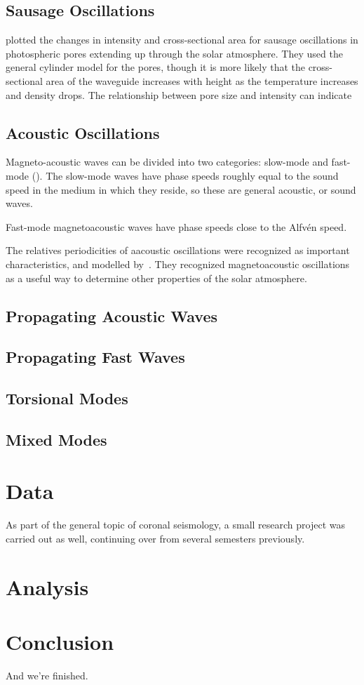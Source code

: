 \documentclass[preprint2]{aastex}
\begin{document}
\subsection{Sausage Oscillations}
\cite{sausage_1} plotted the changes in intensity and cross-sectional
area for sausage oscillations in photospheric pores extending up
through the solar atmosphere. They used the general cylinder model for
the pores, though it is more likely that the cross-sectional area of
the waveguide increases with height as the temperature increases and
density drops. The relationship between pore size and intensity can
indicate

\subsection{Acoustic Oscillations}
Magneto-acoustic waves can be divided into two categories:
slow-mode and fast-mode (\cite{Aschwanden}).
The slow-mode waves have phase speeds roughly equal to the sound speed
in the medium in which they reside, so these are general acoustic, or
sound waves.

Fast-mode magnetoacoustic waves have phase speeds close to the Alfv\'en
speed.

The relatives periodicities of aacoustic oscillations were recognized
as important characteristics, and modelled by~\cite{acoustic_2}.
They recognized magnetoacoustic oscillations as a useful way to determine
other properties of the solar atmosphere.

\subsection{Propagating Acoustic Waves}

\subsection{Propagating Fast Waves}

\subsection{Torsional Modes}
\subsection{Mixed Modes}

\section{Data}\label{data}
As part of the general topic of coronal seismology,
a small research project was carried out as well, continuing
over from several semesters previously.

\section{Analysis}\label{analysis}

\section{Conclusion}\label{conclusion}
And we're finished.


\end{document}
